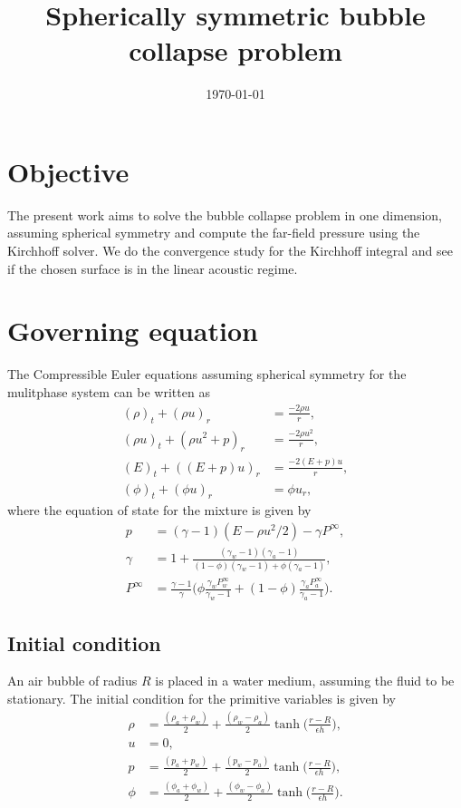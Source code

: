 \documentclass[a4paper]{article}
\title{Spherically symmetric bubble collapse problem}
\author{}
\date{\today}
\begin{document}
\maketitle
\section*{Objective}
The present work aims to solve the bubble collapse problem in one dimension, assuming spherical symmetry and compute the far-field pressure using the Kirchhoff solver. We do the convergence study for the Kirchhoff integral and see if the chosen surface is in the linear acoustic regime.
\section*{Governing equation}
The Compressible Euler equations assuming spherical symmetry for the mulitphase system can be written as
\begin{align}
    (\rho)_t + (\rho u)_r &= \frac{-2\rho u}{r},\\
    (\rho u)_t + (\rho u^2 + p)_r &= \frac{-2\rho u^2}{r}, \\
    (E)_t + ((E + p) u)_r &= \frac{-2(E + p) u}{r},\\
    (\phi)_t + (\phi u)_r &= \phi u_r,
\end{align}
where the equation of state for the mixture is given by 
\begin{align}
    p &= (\gamma - 1)(E - \rho u^2/2) - \gamma P^{\infty},\\    
    \gamma &= 1 + \frac{(\gamma_w - 1)(\gamma_a - 1)}{(1 - \phi)(\gamma_w - 1) + \phi(\gamma_a  - 1)},\\
    P^{\infty} &= \frac{\gamma - 1}{\gamma}\Big( \phi \frac{\gamma_w P^\infty_w}{\gamma_w - 1}  +(1 - \phi)\frac{\gamma_a P^\infty_a}{\gamma_a - 1} \Big). 
\end{align}
\subsection*{Initial condition}
An air bubble of radius $R$ is placed in a water medium, assuming the fluid to be stationary. The initial condition for the primitive variables is given by
\begin{align}
    \rho &= \frac{(\rho_a + \rho_w)}{2} + \frac{(\rho_w - \rho_a)}{2}{\tanh\Big(\frac{r - R}{\epsilon h}}\Big),\\
    u &= 0,\\
    p &= \frac{(p_a + p_w)}{2} + \frac{(p_w - p_a)}{2}{\tanh\Big(\frac{r - R}{\epsilon h}}\Big),\\    
    \phi &= \frac{(\phi_a + \phi_w)}{2} + \frac{(\phi_w - \phi_a)}{2}{\tanh\Big(\frac{r - R}{\epsilon h}}\Big).
\end{align}
\end{document}
